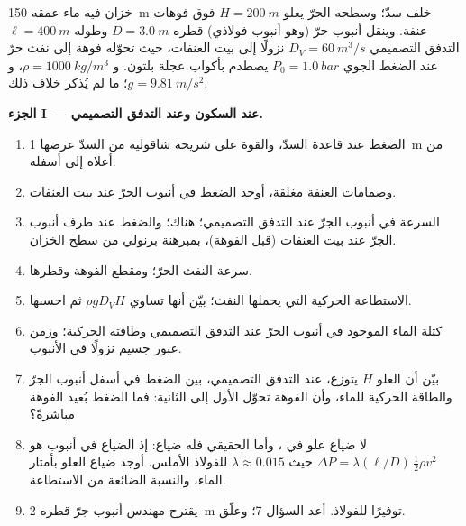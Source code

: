 \begin{problem}
\label{pb:b2:euler-bernoulli:1}

خزان فيه ماء عمقه \qty{150}{m} خلف سدّ؛ وسطحه الحرّ
يعلو $H = \qty{200}{m}$ فوق فوهات عنفة. وينقل أنبوب جرّ (وهو
أنبوب فولاذي) قطره $D = \qty{3.0}{m}$ وطوله $\ell = \qty{400}{m}$
التدفق التصميمي $D_V = \qty{60}{m^3/s}$ نزولًا إلى بيت العنفات،
حيث تحوّله فوهة إلى نفث حرّ عند الضغط الجوي $P_0 =
\qty{1.0}{bar}$ يصطدم بأكواب عجلة بلتون. و $\rho =
\qty{1000}{kg/m^3}$، و $g = \qty{9.81}{m/s^2}$؛  ما لم
يُذكر خلاف ذلك.

\medskip
\noindent\textbf{الجزء I --- عند السكون وعند التدفق التصميمي.}
\begin{enumerate}
  \item الضغط عند قاعدة السدّ، والقوة على شريحة شاقولية من
        السدّ عرضها \qty{1}{m} من أعلاه إلى أسفله.
  \item وصمامات العنفة مغلقة، أوجد الضغط في أنبوب الجرّ عند
        بيت العنفات.
  \item السرعة في أنبوب الجرّ عند التدفق التصميمي؛  هناك؛ والضغط عند طرف أنبوب الجرّ عند بيت
        العنفات (قبل الفوهة)، بمبرهنة برنولي من سطح الخزان.
  \item سرعة النفث الحرّ؛ ومقطع الفوهة وقطرها.
  \item الاستطاعة الحركية التي يحملها النفث؛ بيّن أنها تساوي
        $\rho gD_VH$ ثم احسبها.
  \item كتلة الماء الموجود في أنبوب الجرّ عند التدفق التصميمي
        وطاقته الحركية؛ وزمن عبور جسيم نزولًا في الأنبوب.
  \item بيّن أن العلو $H$ يتوزع، عند التدفق التصميمي، بين الضغط
        في أسفل أنبوب الجرّ والطاقة الحركية للماء، وأن الفوهة
        تحوّل الأول إلى الثانية: فما الضغط بُعيد الفوهة مباشرةً؟
  \item لا ضياع علو في ، وأما الحقيقي فله ضياع: إذ
        الضياع في أنبوب هو $\Delta P = \lambda(\ell/D)\,\tfrac12\rho v^2$ حيث $\lambda
        \approx 0.015$ للفولاذ الأملس. أوجد ضياع العلو بأمتار الماء،
        والنسبة الضائعة من الاستطاعة.
  \item يقترح مهندس أنبوب جرّ قطره \qty{2}{m} توفيرًا للفولاذ.
        أعد السؤال 7؛ وعلّق.
\end{enumerate}


\end{problem}
